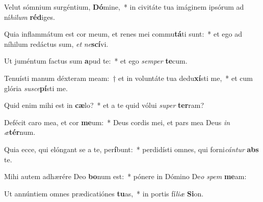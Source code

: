 \item Velut sómnium surgéntium, \textbf{Dó}mine,~* in civitáte tua imáginem ipsórum ad ní\textit{hilum} \textbf{réd}iges.
\item Quia inflammátum est cor meum, et renes mei commu\textbf{tá}ti sunt:~* et ego ad níhilum redáctus sum, \textit{et} \textit{ne}\textbf{scí}vi.
\item Ut juméntum factus sum \textbf{a}pud te:~* et ego \textit{semper} \textbf{te}cum.
\item Tenuísti manum déxteram meam:~† et in voluntáte tua dedu\textbf{xí}sti me,~* et cum glória \textit{susce}\textbf{pí}sti me.
\item Quid enim mihi est in \textbf{cæ}lo?~* et a te quid vólui \textit{super} \textbf{ter}ram?
\item Defécit caro mea, et cor \textbf{me}um:~* Deus cordis mei, et pars mea Deus \textit{in} \textit{æ}\textbf{tér}num.
\item Quia ecce, qui elóngant se a te, per\textbf{í}bunt:~* perdidísti omnes, qui forni\tinyhspace\textit{cántur} \textbf{abs} te.
\item Mihi autem adhærére Deo \textbf{bo}num est:~* pónere in Dómino De\tinyhspace\textit{o} \textit{spem} \textbf{me}am:
\item Ut annúntiem omnes prædicatiónes \textbf{tu}as,~* in portis fí\myhspace\textit{liæ} \textbf{Si}on.
